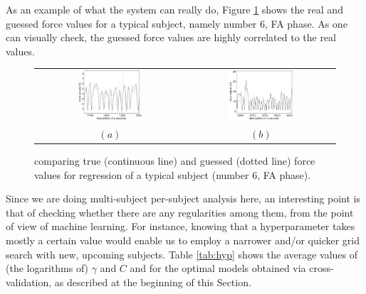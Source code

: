 As an example of what the system can really do, Figure
\ref{fig:examples} shows the real and guessed force values for a
typical subject, namely number $6$, FA phase. As one can visually
check, the guessed force values are highly correlated to the real
values.

\begin{figure}[!ht] \centering
  \begin{tabular}{cc}
    \includegraphics[width=0.45\textwidth]{example_6_one.eps} &
    \includegraphics[width=0.45\textwidth]{example_6_two.eps} \\
    $(a)$ & $(b)$ \\
  \end{tabular}
  \caption{comparing true (continuous line) and guessed (dotted line) force values for regression of a
    typical subject (number $6$, FA phase).}
  \label{fig:examples}
\end{figure}

Since we are doing multi-subject per-subject analysis here, an
interesting point is that of checking whether there are any
regularities among them, from the point of view of machine
learning. For instance, knowing that a hyperparameter takes mostly a
certain value would enable us to employ a narrower and/or quicker grid
search with new, upcoming subjects. Table \ref{tab:hyp} shows the
average values of (the logarithms of) $\gamma$ and $C$ and for the
optimal models obtained via cross-validation, as described at the
beginning of this Section.

